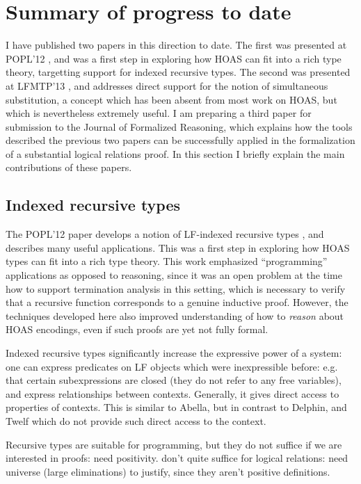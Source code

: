 \documentclass{article}
\begin{document}
\section{Summary of progress to date}
I have published two papers in this direction to date. The first
was presented at POPL'12 \citep{Cave12} , and was a first step in
exploring how HOAS can fit into a rich type theory, targetting support
for indexed recursive types. The second was presented at LFMTP'13
\citep{Cave13}, and addresses direct support for the notion of
simultaneous substitution, a concept which has been absent from most
work on HOAS, but which is nevertheless extremely useful. I am
preparing a third paper \citep{Cave14} for submission to the Journal
of Formalized Reasoning, which explains how the tools described the
previous two papers can be successfully applied in the formalization
of a substantial logical relations proof. In this
section I briefly explain the main contributions of these papers.

\subsection{Indexed recursive types}
The POPL'12 paper develops a notion of LF-indexed recursive types
\citep{Cave12}, and describes many useful applications. This was a
first step in exploring how HOAS types can fit
into a rich type theory. This work emphasized ``programming'' applications
as opposed to reasoning, since it was an open problem at the time how
to support termination analysis in this setting, which is necessary to
verify that a recursive function corresponds to a genuine inductive proof. However, the techniques
developed here also improved understanding of how to \emph{reason} about
HOAS encodings, even if such proofs are yet not fully formal.

Indexed recursive types significantly increase the expressive power of a system: one can express
predicates on LF objects which were inexpressible before: e.g. that
certain subexpressions are closed (they do not refer to any free variables), and express relationships between
contexts. Generally, it gives direct access to properties of
contexts. This is similar to Abella, but in contrast to Delphin, and Twelf which do not
provide such direct access to the context.

Recursive types are suitable for programming, but they do not suffice
if we are interested in proofs: need positivity. don't quite suffice
for logical relations: need universe (large eliminations) to justify,
since they aren't positive definitions.
\end{document}
